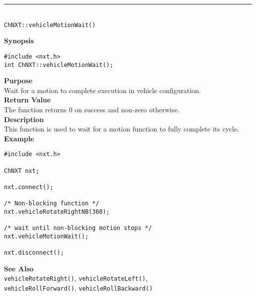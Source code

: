 \noindent
\vspace{5pt}
\rule{4.5in}{0.015in}\\
\noindent
{\LARGE \texttt{ChNXT::vehicleMotionWait()}}\\
{}

\noindent
{\bf Synopsis}
\vspace{-8pt}
\begin{verbatim}
#include <nxt.h>
int ChNXT::vehicleMotionWait();
\end{verbatim}

\noindent
{\bf Purpose}\\
Wait for a motion to complete execution in vehicle configuration.\\

\noindent
{\bf Return Value}\\
The function returns 0 on success and non-zero otherwise.\\

\noindent
{\bf Description}\\
This function is used to wait for a motion function to fully complete its cycle.\\


\noindent
{\bf Example}\\
\begin{verbatim}
#include <nxt.h>

ChNXT nxt;

nxt.connect();

/* Non-blocking function */
nxt.vehicleRotateRightNB(360);

/* wait until non-blocking motion stops */
nxt.vehicleMotionWait();

nxt.disconnect();
\end{verbatim}

\noindent
{\bf See Also}\\
\texttt{vehicleRotateRight()}, \texttt{vehicleRotateLeft()}, \\
\texttt{vehicleRollForward()}, \texttt{vehicleRollBackward()}



